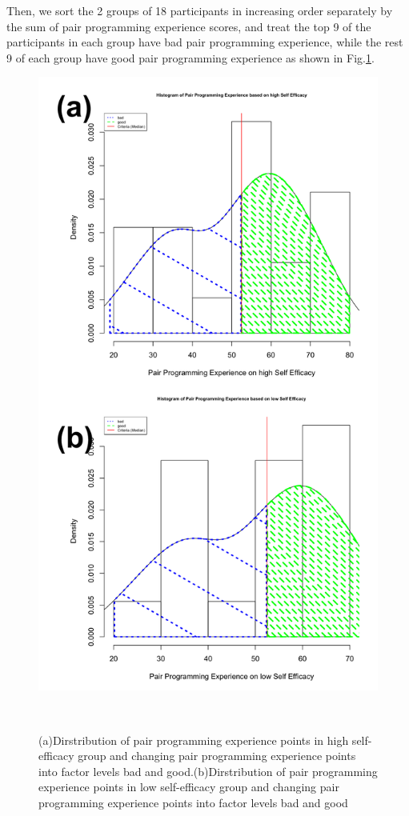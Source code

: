 \documentclass{sigchi}
\begin{document}
Then, we sort the 2 groups of 18 participants in increasing order separately by the sum of pair programming experience scores, and treat the top 9 of the participants in each group have bad pair programming experience, while the rest 9 of each group have good pair programming experience as shown in Fig.\ref{fig:figure2}. 

\begin{figure}
\centering
  \includegraphics[width=0.8\columnwidth]{figures/hist2}
  \caption{(a)Dirstribution of pair programming experience points in high self-efficacy group and changing pair programming experience points  into  factor levels bad and good.(b)Dirstribution of pair programming experience points in low self-efficacy group and changing pair programming experience points  into  factor levels bad and good }~\label{fig:figure2}
\end{figure}
\end{document}
